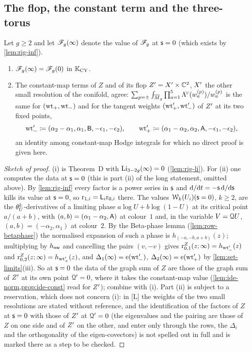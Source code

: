 \subsection{The flop, the constant term and the three-torus}
\label{sec:rig-flop}

\begin{prop}[{\Lref{Proposition~7.15}, parts (i) and (iii): the flop identity $\sF_g(\infty)=\sF_g(0)$}]
\label{prop:rig-flop}
Let $g\geq 2$ and let $\mathscr{F}_g(\infty)$ denote the value of $\mathscr{F}_g$ at $\mathsf{s}=0$ (which exists by \cref{lem:rig-inf}).
\begin{enumerate}
\item $\sF_g(\infty)=\sF_g(0)$ in $\mathbb{K}_{\mathrm{CY}}$.
\item The constant-map terms of $Z$ and of its flop $Z'=X'\times\mathbb{C}^2$, $X'$ the other small resolution of the conifold, agree: $\sum_{p=\pm}\int_{\overline{M}_g}\prod_{a=1}^{5}\Lambda^{\!\vee}(w^{(p)}_a)/w^{(p)}_a$ is the same for $(\mathrm{wt}_+,\mathrm{wt}_-)$ and for the tangent weights $(\mathrm{wt}'_+,\mathrm{wt}'_-)$ of $Z'$ at its two fixed points,
\[
\mathrm{wt}'_-\coloneqq(\alpha_2-\alpha_1,\alpha_1,\mathsf{B},-\epsilon_1,-\epsilon_2),\qquad
\mathrm{wt}'_+\coloneqq(\alpha_1-\alpha_2,\alpha_2,\mathsf{A},-\epsilon_1,-\epsilon_2),
\]
an identity among constant-map Hodge integrals for which no direct proof is given here.
\end{enumerate}
\end{prop}

\begin{proof}[Sketch of proof]
(i) is Theorem~D with $\operatorname{Li}_{3-2g}(\infty)=0$ (\cref{lem:rig-li}). For (ii) one computes the data at $\mathsf{s}=0$ (this is part (ii) of the long statement, omitted above). By \cref{lem:rig-inf} every factor is a power series in $\mathsf{s}$ and $\mathrm{d}/\mathrm{d} t=-\mathsf{s}\,\mathrm{d}/\mathrm{d}\mathsf{s}$ kills its value at $\mathsf{s}=0$, so $\mathrm{r}_{1,i}=\mathsf{L}_i\mathrm{r}_{0,i}$ there. The values $\mathcal{W}_k(U_i)(\mathsf{s}=0)$, $k\geq2$, are the $\theta_{U}^k$-derivatives of a limiting phase $a\log U+b\log(1-U)$ at its critical point $a/(a+b)$, with $(a,b)=(\alpha_1-\alpha_2,\mathsf{A})$ at colour~$1$ and, in the variable $V=\mathcal{Q} U$, $(a,b)=(-\alpha_2,\alpha_1)$ at colour~$2$. By the Beta-phase lemma (\cref{lem:row-betaphase}) the normalised expansion of such a phase is $h_{(-a,-b,a+b)}(z)$; multiplying by $h_{\mathsf{nw}}$ and cancelling the pairs $(v,-v)$ gives $\mathrm{r}^{Z}_{0,1}(z;\infty)=h_{\mathrm{wt}'_-}(z)$ and $\mathrm{r}^{Z}_{0,2}(z;\infty)=h_{\mathrm{wt}'_+}(z)$, and $\Delta_1(\infty)=\mathrm{e}(\mathrm{wt}'_-)$, $\Delta_2(\infty)=\mathrm{e}(\mathrm{wt}'_+)$ by \cref{lem:set-limits}(iii). So at $\mathsf{s}=0$ the data of the graph sum of $Z$ are those of the graph sum of $Z'$ at its own point $\mathcal{Q}'=0$, where it takes the constant-map value (\cref{lem:ide-norm,prop:ide-const} read for $Z'$); combine with (i). Part (ii) is subject to a reservation, which does not concern (i): in [L] the weights of the two small resolutions are stated without reference, and the identification of the factors of $Z$ at $\mathsf{s}=0$ with those of $Z'$ at $\mathcal{Q}'=0$ (the eigenvalues and the pairing are those of $Z$ on one side and of $Z'$ on the other, and enter only through the rows, the $\Delta_i$ and the orthogonality of the eigen-covectors) is not spelled out in full and is marked there as a step to be checked.
\end{proof}

